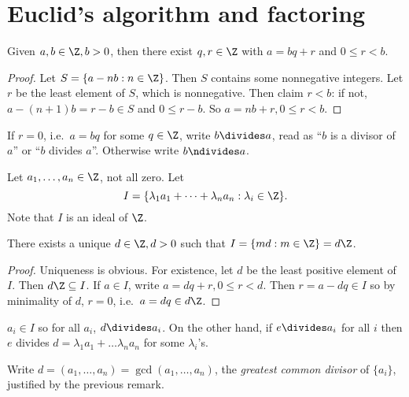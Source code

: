 \documentclass[a4paper]{article}
\begin{document}
\section{Euclid's algorithm and factoring}

\begin{proposition}
  Given \(a, b \in \Z, b > 0\), then there exist \(q, r \in \Z\) with \(a = bq + r\) and \(0 \leq r < b\).
\end{proposition}

\begin{proof}
  Let \(S = \{a - nb: n \in \Z\}\). Then \(S\) contains some nonnegative integers. Let \(r\) be the least element of \(S\), which is nonnegative. Then claim \(r < b\): if not, \(a - (n + 1) b = r - b \in S\) and \( 0 \leq r - b\). So \(a = nb + r, 0 \leq r < b\).
\end{proof}

\begin{notation}
  If \(r = 0\), i.e.\ \(a = bq\) for some \(q \in \Z\), write \(b \divides a\), read as ``\(b\) is a divisor of \(a\)'' or ``\(b\) divides \(a\)''. Otherwise write \(b \ndivides a\).
\end{notation}

Let \(a_1, \dots, a_n \in \Z\), not all zero. Let
\[
  I = \{\lambda_1 a_1 + \dots + \lambda_n a_n: \lambda_i \in \Z\}.
\]
Note that \(I\) is an ideal of \(\Z\).

\begin{lemma}
  There exists a unique \(d \in \Z, d > 0\) such that \(I = \{md: m \in \Z\} = d\Z\).
\end{lemma}

\begin{proof}
  Uniqueness is obvious. For existence, let \(d\) be the least positive element of \(I\). Then \(d\Z \subseteq I\). If \(a \in I\), write \(a = dq + r, 0 \leq r < d\). Then \(r = a - dq \in I\) so by minimality of \(d\), \(r = 0\), i.e.\ \(a = dq \in d\Z\).
\end{proof}

\begin{remark}
  \(a_i \in I\) so for all \(a_i\), \(d \divides a_i\). On the other hand, if \(e \divides a_i\) for all \(i\) then \(e\) divides \(d = \lambda_1 a_1 + \dots \lambda_n a_n\) for some \(\lambda_i\)'s.
\end{remark}

\begin{notation}
  Write \(d = (a_1, \dots, a_n) = \gcd(a_1, \dots, a_n)\), the \emph{greatest common divisor} of \(\{a_i\}\), justified by the previous remark.
\end{notation}
\end{document}
